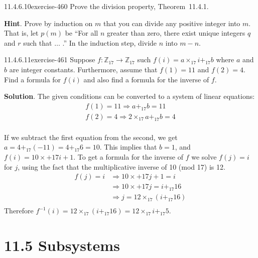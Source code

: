 \documentclass[twoside,10pt,]{book}
\numberwithin{equation}{section}
\begin{document}
\begin{divisionsolution}{11.4.6.10}{}{exercise-460}%
\hypertarget{p-4069}{}%
Prove the division property, Theorem~11.4.1.%
\par\smallskip%
\noindent\textbf{Hint}.\quad%
\hypertarget{p-4070}{}%
Prove by induction on \(m\) that you can divide any positive integer into \(m\). That is, let \(p(m)\) be ``For all \(n\) greater than zero, there exist unique integers \(q\) and \(r\) such that \(\dots\) .''  In the induction step, divide \(n\) into \(m - n\).%
\end{divisionsolution}%
\begin{divisionsolution}{11.4.6.11}{}{exercise-461}%
\hypertarget{p-4071}{}%
Suppose \(f:\mathbb{Z}_{17}\to \mathbb{Z}_{17}\) such \(f(i)=a \times_{17} i +_{17} b \) where \(a\) and \(b\) are integer constants. Furthermore,  assume that \(f(1)=11\) and \(f(2)=4\). Find a formula for \(f(i)\) and also find a formula for the inverse of \(f\).%
\par\smallskip%
\noindent\textbf{Solution}.\quad%
\hypertarget{p-4072}{}%
The given conditions can be converted to a system of linear equations:%
\begin{equation*}
\begin{array}{c}
f(1)=11 \Rightarrow   a +_{17} b = 11\\
f(2)=4  \Rightarrow  2 \times_{17} a +_{17} b =4\\
\end{array}
\end{equation*}
%
\par
\hypertarget{p-4073}{}%
If we subtract the first equation from the second, we get  \(a = 4 +_{17} (-11) = 4 +_{17} 6= 10\).  This implies that \(b=1\), and \(f(i) = 10\times+{17}i + 1\).  To get a formula for the inverse of \(f\) we solve \(f(j)=i\) for \(j\), using the fact that the multiplicative inverse of 10 (mod 17) is 12.%
\begin{equation*}
\begin{split}
f(j)=i & \Rightarrow 10\times+{17}j + 1 = i\\
& \Rightarrow    10\times+{17}j  = i +_{17} 16\\
& \Rightarrow     j = 12\times_{17}( i +_{17} 16)\\
\end{split}
\end{equation*}
Therefore  \(f^{-1}(i) = 12\times_{17}( i +_{17} 16) = 12\times_{17} i +_{17} 5\).%
\end{divisionsolution}%
\section*{11.5 Subsystems}
\end{document}
